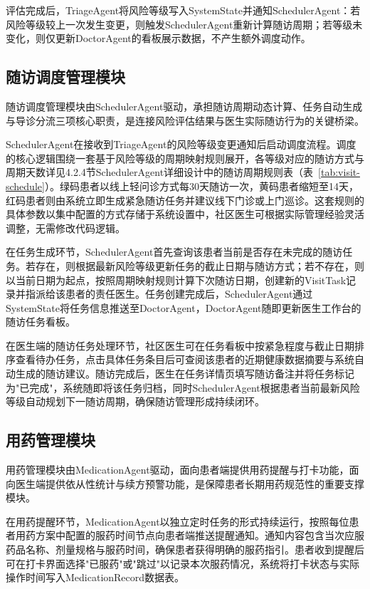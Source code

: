评估完成后，TriageAgent将风险等级写入SystemState并通知SchedulerAgent：若风险等级较上一次发生变更，则触发SchedulerAgent重新计算随访周期；若等级未变化，则仅更新DoctorAgent的看板展示数据，不产生额外调度动作。


\subsection{随访调度管理模块}

随访调度管理模块由SchedulerAgent驱动，承担随访周期动态计算、任务自动生成与导诊分流三项核心职责，是连接风险评估结果与医生实际随访行为的关键桥梁。

SchedulerAgent在接收到TriageAgent的风险等级变更通知后启动调度流程。调度的核心逻辑围绕一套基于风险等级的周期映射规则展开，各等级对应的随访方式与周期天数详见4.2.4节SchedulerAgent详细设计中的随访周期规则表（表~\ref{tab:visit-schedule}）。绿码患者以线上轻问诊方式每30天随访一次，黄码患者缩短至14天，红码患者则由系统立即生成紧急随访任务并建议线下门诊或上门巡诊。这套规则的具体参数以集中配置的方式存储于系统设置中，社区医生可根据实际管理经验灵活调整，无需修改代码逻辑。

在任务生成环节，SchedulerAgent首先查询该患者当前是否存在未完成的随访任务。若存在，则根据最新风险等级更新任务的截止日期与随访方式；若不存在，则以当前日期为起点，按照周期映射规则计算下次随访日期，创建新的VisitTask记录并指派给该患者的责任医生。任务创建完成后，SchedulerAgent通过SystemState将任务信息推送至DoctorAgent，DoctorAgent随即更新医生工作台的随访任务看板。

在医生端的随访任务处理环节，社区医生可在任务看板中按紧急程度与截止日期排序查看待办任务，点击具体任务条目后可查阅该患者的近期健康数据摘要与系统自动生成的随访建议。随访完成后，医生在任务详情页填写随访备注并将任务标记为"已完成"，系统随即将该任务归档，同时SchedulerAgent根据患者当前最新风险等级自动规划下一随访周期，确保随访管理形成持续闭环。


\subsection{用药管理模块}

用药管理模块由MedicationAgent驱动，面向患者端提供用药提醒与打卡功能，面向医生端提供依从性统计与续方预警功能，是保障患者长期用药规范性的重要支撑模块。

在用药提醒环节，MedicationAgent以独立定时任务的形式持续运行，按照每位患者用药方案中配置的服药时间节点向患者端推送提醒通知。通知内容包含当次应服药品名称、剂量规格与服药时间，确保患者获得明确的服药指引。患者收到提醒后可在打卡界面选择"已服药"或"跳过"以记录本次服药情况，系统将打卡状态与实际操作时间写入MedicationRecord数据表。

